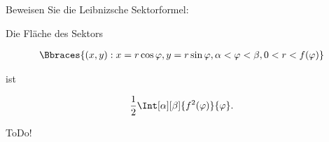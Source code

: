 
\begin{exercise}

Beweisen Sie die Leibnizsche Sektorformel:

Die Fläche des Sektors

\begin{align*}
    \Bbraces
    {
        (x, y):
        x = r \cos \varphi,
        y = r \sin \varphi,
        \alpha < \varphi < \beta,
        0 < r < f(\varphi)
    }
\end{align*}

ist

\begin{align*}
    \frac{1}{2}
    \Int[\alpha][\beta]
    {
        f^2(\varphi)
    }{\varphi}.
\end{align*}

\end{exercise}


\begin{solution}

ToDo!

\end{solution}

